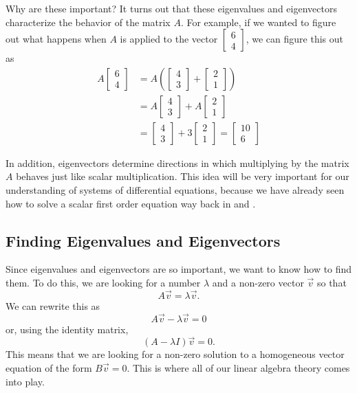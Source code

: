 Why are these important? It turns out that these eigenvalues and eigenvectors characterize the behavior of the matrix $A$. For example, if we wanted to figure out what happens when $A$ is applied to the vector $\begin{bmatrix} 6 \\ 4 \end{bmatrix}$, we can figure this out as
\[ \begin{split}
A\begin{bmatrix} 6 \\ 4 \end{bmatrix} &= A\left(\begin{bmatrix} 4 \\ 3 \end{bmatrix} + \begin{bmatrix} 2 \\ 1 \end{bmatrix} \right) \\
&= A\begin{bmatrix} 4 \\ 3 \end{bmatrix} + A\begin{bmatrix}2 \\ 1 \end{bmatrix} \\
&= \begin{bmatrix}4 \\ 3 \end{bmatrix} + 3\begin{bmatrix}2 \\ 1 \end{bmatrix} = \begin{bmatrix} 10 \\ 6 \end{bmatrix}
\end{split}
\]

In addition, eigenvectors determine directions in which multiplying by the matrix $A$ behaves just like scalar multiplication. This idea will be very important for our understanding of systems of differential equations, because we have already seen how to solve a scalar first order equation way back in  and . 

\subsection{Finding Eigenvalues and Eigenvectors}

Since eigenvalues and eigenvectors are so important, we want to know how to find them. To do this, we are looking for a number $\lambda$ and a non-zero vector $\vec{v}$ so that \[ A\vec{v} = \lambda\vec{v}. \] We can rewrite this as \[A\vec{v} - \lambda \vec{v} = 0 \] or, using the identity matrix, \[ (A - \lambda I)\vec{v} = 0. \] This means that we are looking for a non-zero solution to a homogeneous vector equation of the form $B\vec{v} = 0$. This is where all of our linear algebra theory comes into play.

